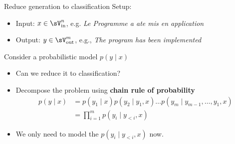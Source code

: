 \documentclass[usenames,dvipsnames,notes,11pt,aspectratio=169,hyperref={colorlinks=true, linkcolor=blue}]{beamer}
\begin{document}
\begin{frame}
    {Reduce generation to classification}
    Setup:\\
    \begin{itemize}
        \item Input: $x \in \sV_{\text{in}}^n$, e.g. \textit{Le Programme    a    ate    mis    en application}
        \item Output: $y \in \sV_{\text{out}}^m$, e.g., \textit{The program has been implemented }
    \end{itemize}
    \pause

    Consider a probabilistic model $p(y\mid x)$\\
    \begin{itemize}[<+->]
        \item Can we reduce it to classification?
        \item Decompose the problem using \textbf{chain rule of probability} 
            \begin{align*}
                p(y\mid x) &= p(y_1\mid x)p(y_2\mid y_1, x)\ldots p(y_m\mid y_{m-1},\ldots,y_1, x) \\
                &= \prod_{i=1}^m p(y_i\mid y_{<i}, x)
            \end{align*}
        \item We only need to model the  $p(y_i\mid y_{<i}, x)$ now.
    \end{itemize}
\end{frame}
\end{document}
